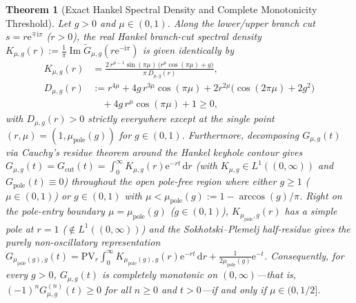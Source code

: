 \documentclass[twocolumn,10pt,amsmath,amssymb,floatfix]{revtex4-2}
\theoremstyle{plain}
\newtheorem{theorem}{Theorem}
\theoremstyle{definition}
\newcommand{\dd}{\mathrm{d}}
\newcommand{\ii}{\mathrm{i}}
\newcommand{\ee}{\mathrm{e}}
\newcommand{\mupole}{\mu_{\mathrm{pole}}}
\begin{document}
\begin{theorem}[Exact Hankel Spectral Density and Complete Monotonicity Threshold]
\label{thm:hankel_cm}
Let $g > 0$ and $\mu \in (0,1)$. Along the lower/upper branch cut $s = r\ee^{\mp\ii\pi}$ ($r > 0$), the real Hankel branch-cut spectral density $K_{\mu,g}(r) := \frac{1}{\pi}\operatorname{Im}\tilde{G}_{\mu,g}(r\ee^{-\ii\pi})$ is given identically by
\begin{align}
K_{\mu,g}(r) &= \frac{2\,r^{\mu-1}\sin(\pi\mu)\,\big(r^\mu \cos(\pi\mu) + g\big)}{\pi\,D_{\mu,g}(r)}, \label{eq:K_spectral} \\
D_{\mu,g}(r) &:= r^{4\mu} + 4g\,r^{3\mu}\cos(\pi\mu) + 2r^{2\mu}\big(\cos(2\pi\mu) + 2g^2\big) \nonumber\\
&\quad + 4g\,r^\mu\cos(\pi\mu) + 1 \ge 0, \label{eq:D_spectral}
\end{align}
with $D_{\mu,g}(r) > 0$ strictly everywhere except at the single point $(r,\mu) = (1,\mupole(g))$ for $g \in (0,1)$. Furthermore, decomposing $G_{\mu,g}(t)$ via Cauchy's residue theorem around the Hankel keyhole contour gives $G_{\mu,g}(t) = G_{\mathrm{cut}}(t) = \int_0^\infty K_{\mu,g}(r)\ee^{-rt}\,\dd r$ (with $K_{\mu,g} \in L^1((0,\infty))$ and $G_{\mathrm{pole}}(t) \equiv 0$) throughout the open pole-free region where either $g \ge 1$ ($\mu \in (0,1)$) or $g \in (0,1)$ with $\mu < \mupole(g) := 1 - \arccos(g)/\pi$. Right on the pole-entry boundary $\mu = \mupole(g)$ ($g \in (0,1)$), $K_{\mupole,g}(r)$ has a simple pole at $r = 1$ ($\notin L^1((0,\infty))$) and the Sokhotski--Plemelj half-residue gives the purely non-oscillatory representation $G_{\mupole(g),g}(t) = \mathrm{PV}_r\!\int_0^\infty K_{\mupole(g),g}(r)\ee^{-rt}\,\dd r + \frac{1}{2\mupole(g)}\ee^{-t}$. Consequently, for every $g > 0$, $G_{\mu,g}(t)$ is completely monotonic on $(0,\infty)$---that is, $(-1)^n G_{\mu,g}^{(n)}(t) \ge 0$ for all $n \ge 0$ and $t > 0$---if and only if $\mu \in (0, 1/2]$.
\end{theorem}
\end{document}
